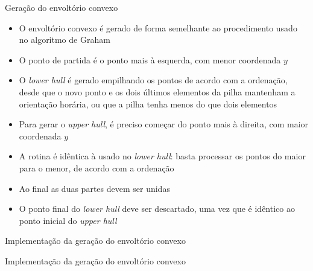 \begin{frame}[fragile]{Geração do envoltório convexo}

    \begin{itemize}
        \item O envoltório convexo é gerado de forma semelhante ao procedimento usado no 
            algoritmo de Graham

        \item O ponto de partida é o ponto mais à esquerda, com menor coordenada $y$

        \item O \textit{lower hull} é gerado empilhando os pontos de acordo com a ordenação,
            desde que o novo ponto e os dois últimos elementos da pilha mantenham a orientação 
            horária, ou que a pilha tenha menos do que dois elementos

        \item Para gerar o \textit{upper hull}, é preciso começar do ponto mais à direita, com
            maior coordenada $y$

        \item A rotina é idêntica à usado no \textit{lower hull}: basta processar os pontos
            do maior para o menor, de acordo com a ordenação

        \item Ao final as duas partes devem ser unidas

        \item O ponto final do \textit{lower hull} deve ser descartado, uma vez que é idêntico
            ao ponto inicial do \textit{upper hull} 

    \end{itemize}

\end{frame}



\begin{frame}[fragile]{Implementação da geração do envoltório convexo}
\end{frame}

\begin{frame}[fragile]{Implementação da geração do envoltório convexo}
\end{frame}





